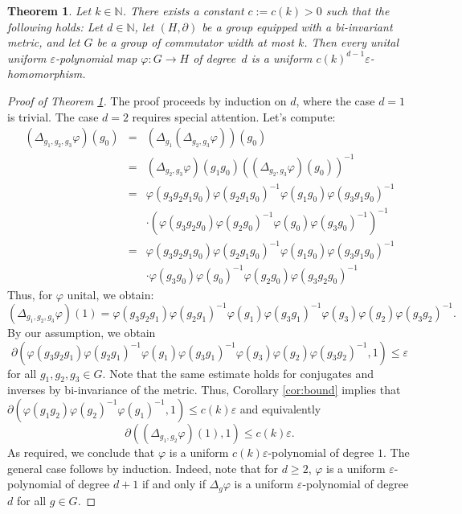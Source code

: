 \documentclass[10pt,a4paper]{amsart}
\newtheorem{theorem}{Theorem}
\begin{document}
\begin{theorem} \label{thm:approx}
Let $k \in \mathbb{N}$. There exists a constant $c := c(k) > 0$ such that the following holds:  
Let $d \in \mathbb{N}$, let $(H, \partial)$ be a group equipped with a bi-invariant metric, and let $G$ be a group of commutator width at most $k$. Then every unital uniform $\varepsilon$-polynomial map $\varphi \colon G \to H$ of degree~$d$ is a uniform $c(k)^{d-1} \varepsilon$-homomorphism.
\end{theorem}

\begin{proof}[Proof of Theorem \ref{thm:approx}]
The proof proceeds by induction on $d$, where the case $d=1$ is trivial. The case $d=2$ requires special attention. Let's compute:
\begin{eqnarray*}
(\Delta_{g_1,g_2,g_3} \varphi)(g_0) &=& (\Delta_{g_1}(\Delta_{g_2,g_3}  \varphi))(g_0) \\
&=& (\Delta_{g_2,g_3}  \varphi)(g_1g_0) ((\Delta_{g_2,g_3}  \varphi)(g_0))^{-1} \\
&=&\varphi(g_3g_2g_1g_0) \varphi(g_2g_1g_0)^{-1} \varphi(g_1g_0) \varphi(g_3g_1g_0)^{-1} \\
&& \cdot (\varphi(g_3g_2g_0) \varphi(g_2g_0)^{-1} \varphi(g_0) \varphi(g_3g_0)^{-1})^{-1} \\
&=&\varphi(g_3g_2g_1g_0) \varphi(g_2g_1g_0)^{-1} \varphi(g_1g_0) \varphi(g_3g_1g_0)^{-1} \\
&& \cdot \varphi(g_3g_0)\varphi(g_0)^{-1}\varphi(g_2g_0)\varphi(g_3g_2g_0)^{-1}
\end{eqnarray*}
Thus, for $\varphi$ unital, we obtain:
\begin{equation*}
(\Delta_{g_1,g_2,g_3} \varphi)(1)=
\varphi(g_3g_2g_1) \varphi(g_2g_1)^{-1} \varphi(g_1) \varphi(g_3g_1)^{-1} \varphi(g_3)\varphi(g_2)\varphi(g_3g_2)^{-1}.
\end{equation*}
By our assumption, we obtain
$$\partial(\varphi(g_3g_2g_1) \varphi(g_2g_1)^{-1} \varphi(g_1) \varphi(g_3g_1)^{-1} \varphi(g_3)\varphi(g_2)\varphi(g_3g_2)^{-1},1) \leq \varepsilon$$ for all $g_1,g_2,g_3 \in G$. Note that the same estimate holds for conjugates and inverses by bi-invariance of the metric. Thus, Corollary \ref{cor:bound} implies that $\partial(\varphi(g_1g_2)\varphi(g_2)^{-1}\varphi(g_1)^{-1},1)\leq c(k) \varepsilon$ and equivalently
$$\partial((\Delta_{g_1,g_2}\varphi)(1),1) \leq c(k) \varepsilon.$$
As required, we conclude that $\varphi$ is a uniform $c(k)\varepsilon$-polynomial of degree $1$. The general case follows by induction. Indeed, note that for $d \geq 2$, $\varphi$ is a uniform $\varepsilon$-polynomial of degree $d+1$ if and only if $\Delta_g \varphi$ is a uniform $\varepsilon$-polynomial of degree $d$ for all $g \in G.$
\end{proof}
\end{document}
